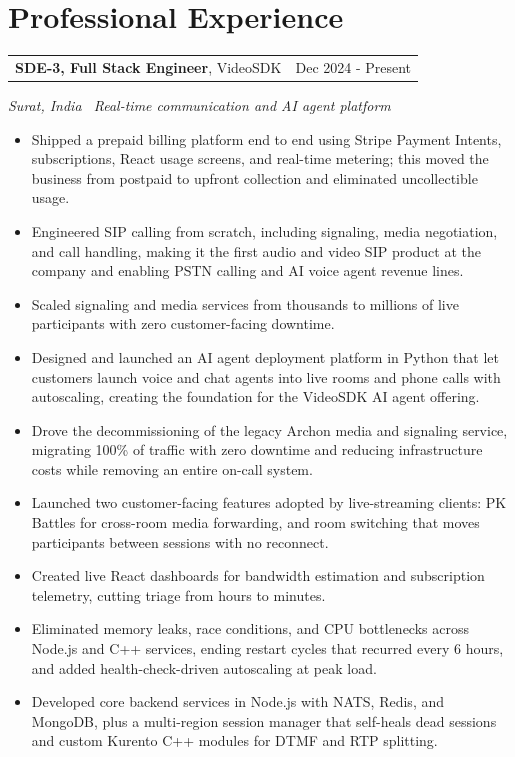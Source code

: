 \documentclass[9pt,a4paper]{extarticle}
\makeatletter
\newcommand{\role}[4]{%
  \vspace{2.2mm}
  \begin{tabularx}{\textwidth}{@{}Xr@{}}
    \textbf{#2}, #1 & \textcolor{muted}{#3} \\[1.5pt]
  \end{tabularx}
  \vspace{-1.2mm}
  \textcolor{muted}{\small\itshape #4}
  \vspace{0.8mm}
}
\makeatother
\begin{document}
\section{Professional Experience}

\role{VideoSDK}{SDE-3, Full Stack Engineer}{Dec 2024 - Present}{Surat, India \textbar\ Real-time communication and AI agent platform}
\begin{itemize}
  \item Shipped a prepaid billing platform end to end using Stripe Payment Intents, subscriptions, React usage screens, and real-time metering; this moved the business from postpaid to upfront collection and eliminated uncollectible usage.
  \item Engineered SIP calling from scratch, including signaling, media negotiation, and call handling, making it the f\/irst audio and video SIP product at the company and enabling PSTN calling and AI voice agent revenue lines.
  \item Scaled signaling and media services from thousands to millions of live participants with zero customer-facing downtime.
  \item Designed and launched an AI agent deployment platform in Python that let customers launch voice and chat agents into live rooms and phone calls with autoscaling, creating the foundation for the VideoSDK AI agent of\/fering.
  \item Drove the decommissioning of the legacy Archon media and signaling service, migrating 100\% of traf\/f\/ic with zero downtime and reducing infrastructure costs while removing an entire on-call system.
  \item Launched two customer-facing features adopted by live-streaming clients: PK Battles for cross-room media forwarding, and room switching that moves participants between sessions with no reconnect.
  \item Created live React dashboards for bandwidth estimation and subscription telemetry, cutting triage from hours to minutes.
  \item Eliminated memory leaks, race conditions, and CPU bottlenecks across Node.js and C++ services, ending restart cycles that recurred every 6 hours, and added health-check-driven autoscaling at peak load.
  \item Developed core backend services in Node.js with NATS, Redis, and MongoDB, plus a multi-region session manager that self-heals dead sessions and custom Kurento C++ modules for DTMF and RTP splitting.
\end{itemize}
\end{document}

